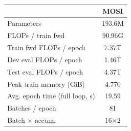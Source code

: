\begin{tabular}{l|c}
\toprule
& MOSI \\
\midrule
Parameters & 193.6M \\
FLOPs / train fwd & 90.96G \\
Train fwd FLOPs / epoch & 7.37T \\
Dev eval FLOPs / epoch & 1.46T \\
Test eval FLOPs / epoch & 4.37T \\
Peak train memory (GiB) & 4.770 \\
Avg. epoch time (full loop, s) & 19.59 \\
Batches / epoch & 81 \\
Batch $\times$ accum. & 16$\times$2 \\
\bottomrule
\end{tabular}
